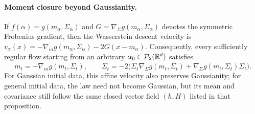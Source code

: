 \paragraph{Moment closure beyond Gaussianity.}
If $f(\alpha)=g(m_\alpha,\Sigma_\alpha)$ and $G=\nabla_\Sigma g(m_\alpha,\Sigma_\alpha)$ denotes the symmetric Frobenius gradient, then the Wasserstein descent velocity is
\(v_\alpha(x)=-\nabla_m g(m_\alpha,\Sigma_\alpha)-2G(x-m_\alpha)\).
Consequently, every sufficiently regular flow starting from an arbitrary $\alpha_0\in\mathcal{P}_2(\mathbb{R}^d)$ satisfies
\begin{equation}\label{eq-distribution-free-mean-covariance-closure}
\dot m_t=-\nabla_m g(m_t,\Sigma_t),
\qquad
\dot\Sigma_t
=
-2\bigl(\Sigma_t\nabla_\Sigma g(m_t,\Sigma_t)
+\nabla_\Sigma g(m_t,\Sigma_t)\Sigma_t\bigr).
\end{equation}
For Gaussian initial data, this affine velocity also preserves Gaussianity; for general initial data, the law need not become Gaussian, but its mean and covariance still follow the same closed vector field $(h,H)$ listed in that proposition.

